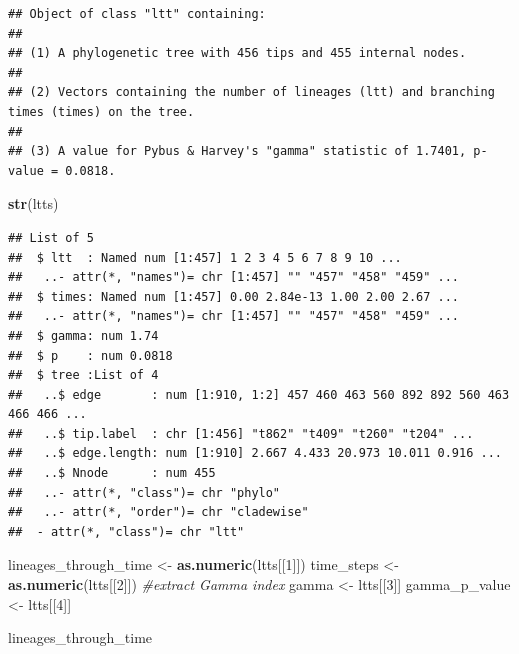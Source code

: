 \documentclass[]{book}
\newenvironment{Shaded}{\begin{snugshade}}{\end{snugshade}}
\newcommand{\KeywordTok}[1]{\textcolor[rgb]{0.13,0.29,0.53}{\textbf{{#1}}}}
\newcommand{\DecValTok}[1]{\textcolor[rgb]{0.00,0.00,0.81}{{#1}}}
\newcommand{\StringTok}[1]{\textcolor[rgb]{0.31,0.60,0.02}{{#1}}}
\newcommand{\CommentTok}[1]{\textcolor[rgb]{0.56,0.35,0.01}{\textit{{#1}}}}
\newcommand{\NormalTok}[1]{{#1}}
\theoremstyle{definition}
\theoremstyle{definition}
\theoremstyle{definition}
\theoremstyle{remark}
\begin{document}
\begin{verbatim}
## Object of class "ltt" containing:
## 
## (1) A phylogenetic tree with 456 tips and 455 internal nodes.
## 
## (2) Vectors containing the number of lineages (ltt) and branching times (times) on the tree.
## 
## (3) A value for Pybus & Harvey's "gamma" statistic of 1.7401, p-value = 0.0818.
\end{verbatim}

\begin{Shaded}
\begin{Highlighting}[]
\KeywordTok{str}\NormalTok{(ltts)}
\end{Highlighting}
\end{Shaded}

\begin{verbatim}
## List of 5
##  $ ltt  : Named num [1:457] 1 2 3 4 5 6 7 8 9 10 ...
##   ..- attr(*, "names")= chr [1:457] "" "457" "458" "459" ...
##  $ times: Named num [1:457] 0.00 2.84e-13 1.00 2.00 2.67 ...
##   ..- attr(*, "names")= chr [1:457] "" "457" "458" "459" ...
##  $ gamma: num 1.74
##  $ p    : num 0.0818
##  $ tree :List of 4
##   ..$ edge       : num [1:910, 1:2] 457 460 463 560 892 892 560 463 466 466 ...
##   ..$ tip.label  : chr [1:456] "t862" "t409" "t260" "t204" ...
##   ..$ edge.length: num [1:910] 2.667 4.433 20.973 10.011 0.916 ...
##   ..$ Nnode      : num 455
##   ..- attr(*, "class")= chr "phylo"
##   ..- attr(*, "order")= chr "cladewise"
##  - attr(*, "class")= chr "ltt"
\end{verbatim}

\begin{Shaded}
\begin{Highlighting}[]
\NormalTok{lineages_through_time <-}\StringTok{ }\KeywordTok{as.numeric}\NormalTok{(ltts[[}\DecValTok{1}\NormalTok{]])}
\NormalTok{time_steps <-}\StringTok{ }\KeywordTok{as.numeric}\NormalTok{(ltts[[}\DecValTok{2}\NormalTok{]])}
\CommentTok{#extract Gamma index}
\NormalTok{gamma <-}\StringTok{ }\NormalTok{ltts[[}\DecValTok{3}\NormalTok{]]}
\NormalTok{gamma_p_value <-}\StringTok{ }\NormalTok{ltts[[}\DecValTok{4}\NormalTok{]]}
\end{Highlighting}
\end{Shaded}

\begin{Shaded}
\begin{Highlighting}[]
\NormalTok{lineages_through_time }
\end{Highlighting}
\end{Shaded}
\end{document}
